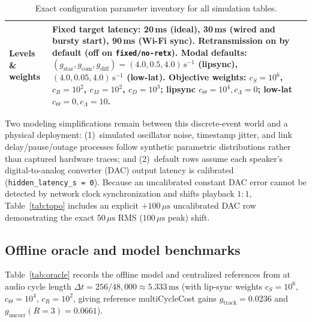 \documentclass[11pt,a4paper]{article}
\DeclareRobustCommand{\lean}[1]{{\ttfamily\def\_{\textunderscore\allowbreak}#1}}
\theoremstyle{definition}
\begin{document}
\begin{table}[htb]
\begin{tabular}{@{}l >{\raggedright\arraybackslash}p{11.4cm}@{}}
Levels \& weights &
  Fixed target latency: 20\,ms (ideal), 30\,ms (wired and bursty start), 90\,ms
  (Wi-Fi sync). Retransmission on by default (off on \texttt{fixed/no-retx}).
  Modal defaults: $(g_{\mathrm{star}}, g_{\mathrm{com}}, g_{\mathrm{diff}}) =
  (4.0, 0.5, 4.0)\,\text{s}^{-1}$ (lipsync), $(4.0, 0.05, 4.0)\,\text{s}^{-1}$
  (low-lat). Objective weights: $c_S = 10^6$, $c_R = 10^2$, $c_M = 10^2$,
  $c_D = 10^3$; lipsync $c_\Theta = 10^4, c_\Lambda = 0$; low-lat
  $c_\Theta = 0, c_\Lambda = 10$. \\
\bottomrule
\end{tabular}
\caption{Exact configuration parameter inventory for all simulation tables.}
\label{tab:params}
\end{table}

Two modeling simplifications remain between this discrete-event world and a
physical deployment: (1)~simulated oscillator noise, timestamp jitter, and link
delay/pause/outage processes follow synthetic parametric distributions rather
than captured hardware traces; and (2)~default rows assume each speaker's
digital-to-analog converter (DAC) output latency is calibrated
(\texttt{hidden\_latency\_s = 0}). Because an uncalibrated constant DAC error
cannot be detected by network clock synchronization and shifts playback $1{:}1$,
Table~\ref{tab:topo} includes an explicit $+100\,\mu\text{s}$ uncalibrated DAC
row demonstrating the exact $50\,\mu\text{s}$ RMS ($100\,\mu\text{s}$ peak)
shift.

\subsection{Offline oracle and model benchmarks}
\label{sec:sim-oracle}

Table~\ref{tab:oracle} records the offline model and centralized references from
 at audio cycle length
$\Delta t = 256 / 48{,}000 \approx 5.333\,\text{ms}$ (with lip-sync weights
$c_S = 10^6$, $c_\Theta = 10^4$, $c_R = 10^2$, giving reference
\lean{multiCycleCost} gains $g_{\mathrm{track}} = 0.0236$ and
$g_{\mathrm{uncorr}}(R{=}3) = 0.0661$).
\end{document}
